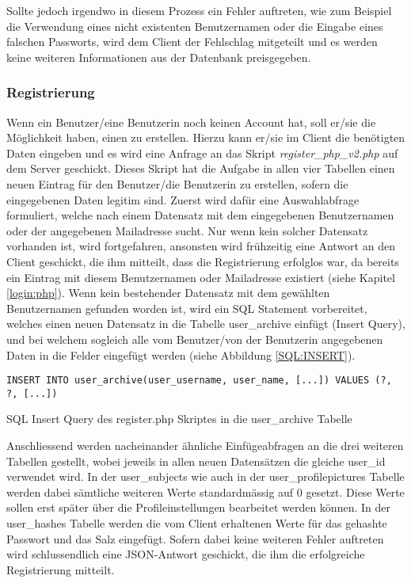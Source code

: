 \documentclass[../main.tex]{subfiles}
\begin{document}
	 Sollte jedoch irgendwo in diesem Prozess ein Fehler auftreten, wie zum Beispiel die Verwendung eines nicht existenten Benutzernamen oder die Eingabe eines falschen Passworts, wird dem Client der Fehlschlag mitgeteilt und es werden keine weiteren Informationen aus der Datenbank preisgegeben.
	 
	 \subsubsection{Registrierung}
	 Wenn ein Benutzer/eine Benutzerin noch keinen Account hat, soll er/sie die Möglichkeit haben, einen zu erstellen. Hierzu kann er/sie im Client die benötigten Daten eingeben und es wird eine Anfrage an das Skript \emph{register\_php\_v2.php} auf dem Server geschickt. Dieses Skript hat die Aufgabe in allen vier Tabellen einen neuen Eintrag für den Benutzer/die Benutzerin zu erstellen, sofern die eingegebenen Daten legitim sind. Zuerst wird dafür eine Auswahlabfrage formuliert, welche nach einem Datensatz mit dem eingegebenen Benutzernamen oder der angegebenen Mailadresse sucht. Nur wenn kein solcher Datensatz vorhanden ist, wird fortgefahren, ansonsten wird frühzeitig eine Antwort an den Client geschickt, die ihm mitteilt, dass die Registrierung erfolglos war, da bereits ein Eintrag mit diesem Benutzernamen oder Mailadresse existiert (siehe Kapitel \ref{login:php}). Wenn kein bestehender Datensatz mit dem gewählten Benutzernamen gefunden worden ist, wird ein SQL Statement vorbereitet, welches einen neuen Datensatz in die Tabelle user\_archive einfügt (Insert Query), und bei welchem sogleich alle vom Benutzer/von der Benutzerin angegebenen Daten in die Felder eingefügt werden (siehe Abbildung \ref{SQL:INSERT}).
	 
	 \begin{code} 
	 	\begin{center}
	 		\begin{verbatim}
INSERT INTO user_archive(user_username, user_name, [...]) VALUES (?, ?, [...])
	 		\end{verbatim}
	 		\caption{SQL Insert Query des register.php Skriptes in die user\_archive Tabelle}\label{SQL:INSERT}
	 	\end{center}
	 \end{code}
	 
	 Anschliessend werden nacheinander ähnliche Einfügeabfragen an die drei weiteren Tabellen gestellt, wobei jeweils in allen neuen Datensätzen die gleiche user\_id verwendet wird. In der user\_subjects wie auch in der \newline user\_profilepictures Tabelle werden dabei sämtliche weiteren Werte standardmässig auf 0 gesetzt. Diese Werte sollen erst später über die Profileinstellungen bearbeitet werden können. In der user\_hashes Tabelle werden die vom Client erhaltenen Werte für das gehashte Passwort und das Salz eingefügt. Sofern dabei keine weiteren Fehler auftreten wird schlussendlich eine JSON-Antwort geschickt, die ihm die erfolgreiche Registrierung mitteilt.
	 
\end{document}
